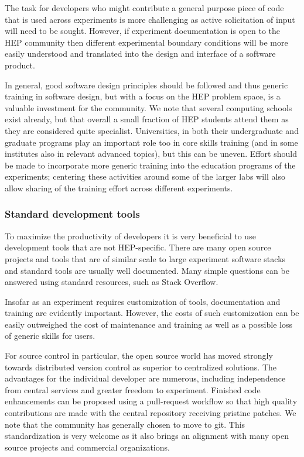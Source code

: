 \documentclass[12pt,a4paper]{article}
\begin{document}
The task for developers who might contribute a general purpose piece of
code that is used across experiments is more challenging as active
solicitation of input will need to be sought. However, if experiment
documentation is open to the HEP community then different experimental
boundary conditions will be more easily understood and translated into
the design and interface of a software product.

In general, good software design principles should be followed and thus
generic training in software design, but with a focus on the HEP problem
space, is a valuable investment for the community. We note that several
computing schools exist already, but that overall a small fraction of
HEP students attend them as they are considered quite specialist.
Universities, in both their undergraduate and graduate programs play an
important role too in core skills training (and in some institutes also
in relevant advanced topics), but this can be uneven. Effort should be
made to incorporate more generic training into the education programs of
the experiments; centering these activities around some of the larger
labs will also allow sharing of the training effort across different
experiments.

\hypertarget{standard-development-tools}{%
\subsubsection{Standard development
tools}\label{standard-development-tools}}

To maximize the productivity of developers it is very beneficial to use
development tools that are not HEP-specific. There are many open source
projects and tools that are of similar scale to large experiment
software stacks and standard tools are usually well documented. Many
simple questions can be answered using standard resources, such as Stack
Overflow.

Insofar as an experiment requires customization of tools, documentation
and training are evidently important. However, the costs of such
customization can be easily outweighed the cost of maintenance and
training as well as a possible loss of generic skills for users.

For source control in particular, the open source world has moved
strongly towards distributed version control as superior to centralized
solutions. The advantages for the individual developer are numerous,
including independence from central services and greater freedom to
experiment. Finished code enhancements can be proposed using a
pull-request workflow so that high quality contributions are made with
the central repository receiving pristine patches. We note that the
community has generally chosen to move to git. This standardization is
very welcome as it also brings an alignment with many open source
projects and commercial organizations.
\end{document}
